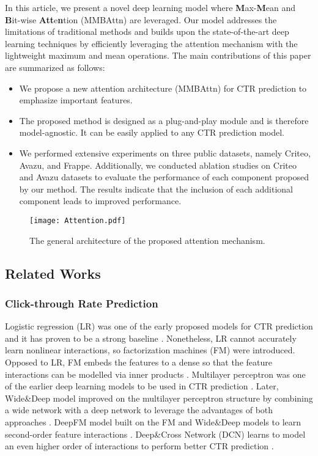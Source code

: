 \documentclass{article}
\begin{document}
In this article, we present a novel deep learning model where \textbf{M}ax-\textbf{M}ean and \textbf{B}it-wise \textbf{Att}e\textbf{n}tion (MMBAttn) are leveraged. Our model addresses the limitations of traditional methods and builds upon the state-of-the-art deep learning techniques by efficiently leveraging the attention mechanism with the lightweight maximum and mean operations.
The main contributions of this paper are summarized as follows:
\begin{itemize}
  \item We propose a new attention architecture (MMBAttn) for CTR prediction to emphasize important features.
  \item The proposed method is designed as a plug-and-play module and is therefore model-agnostic. It can be easily applied to any CTR prediction model.
  \item We performed extensive experiments on three public datasets, namely Criteo, Avazu, and Frappe. Additionally, we conducted ablation studies on Criteo and Avazu datasets to evaluate the performance of each component proposed by our method. The results indicate that the inclusion of each additional component leads to improved performance.
\end{itemize}

\begin{figure}[t]
\begin{center}
\texttt{[image: Attention.pdf]}
\caption{The general architecture of the proposed attention mechanism.}\label{fig:architecture}
\end{center}
\end{figure}

\subsection{Related Works}

\subsubsection{Click-through Rate Prediction}
Logistic regression (LR) was one of the early proposed models for CTR prediction and it has proven to be a strong baseline \cite{logistic2013trenches, logistic2007}. Nonetheless, LR cannot accurately learn nonlinear interactions, so factorization machines (FM) were introduced. Opposed to LR, FM embeds the features to a dense so that the feature interactions can be modelled via inner products \cite{fm}. Multilayer perceptron was one of the earlier deep learning models to be used in CTR prediction \cite{covington2016deep}. Later, Wide\&Deep model improved on the multilayer perceptron structure by combining a wide network with a deep network to leverage the advantages of both approaches \cite{wide&deep}. DeepFM model built on the FM and Wide\&Deep models to learn second-order feature interactions \cite{guo2017deepfm}. Deep\&Cross Network (DCN) learns to model an even higher order of interactions to perform better CTR prediction \cite{deep&cross}.
\end{document}
